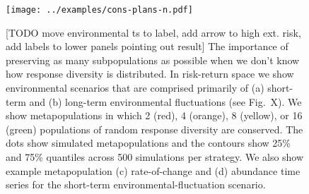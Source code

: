 \clearpage

\begin{figure}[htbp]
\centering
\texttt{[image: ../examples/cons-plans-n.pdf]}
\caption{[TODO move environmental ts to label, add arrow to high ext. risk, add labels to lower panels pointing out result] The importance of preserving as many subpopulations as possible when we don't know how response diversity is distributed. In risk-return space we show environmental scenarios that are comprised primarily of (a) short-term and (b) long-term environmental fluctuations (see Fig.~X). We show metapopulations in which 2 (red), 4 (orange), 8 (yellow), or 16 (green) populations of random response diversity are conserved. The dots show simulated metapopulations and the contours show 25\% and 75\% quantiles across 500 simulations per strategy. We also show example metapopulation (c) rate-of-change and (d) abundance time series for the short-term environmental-fluctuation scenario.}
\label{f:n-mv}
\end{figure}

\clearpage
